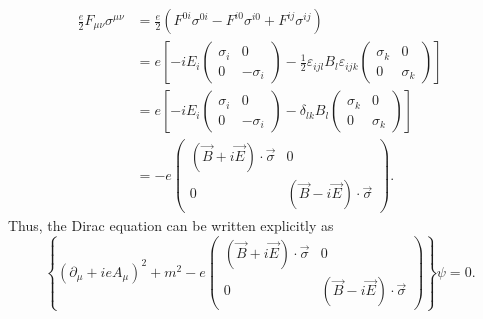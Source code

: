 \documentclass[11pt]{article}
\theoremstyle{definition}
\begin{document}
\begin{equation}
\begin{aligned}
    \frac{e}{2}F_{\mu\nu}\sigma^{\mu\nu} &= \frac{e}{2}(F^{0i}\sigma^{0i} - F^{i0}\sigma^{i0} + F^{ij}\sigma^{ij})\\
    &= e\left[-iE_i
    \begin{pmatrix}
        \sigma_i & 0\\
        0&-\sigma_i
    \end{pmatrix}
    - \frac{1}{2}\varepsilon_{ijl}B_l\varepsilon_{ijk}
    \begin{pmatrix}
        \sigma_k & 0\\
        0& \sigma_k
    \end{pmatrix}
    \right]\\
    &= e\left[-iE_i
    \begin{pmatrix}
        \sigma_i & 0\\
        0&-\sigma_i
    \end{pmatrix}
    - \delta_{lk}B_l
    \begin{pmatrix}
        \sigma_k & 0\\
        0& \sigma_k
    \end{pmatrix}
    \right]\\
    &= -e
    \begin{pmatrix}
        (\vec{B}+i\vec{E})\cdot\vec{\sigma}& 0\\
        0& (\vec{B}-i\vec{E})\cdot\vec{\sigma}
    \end{pmatrix}.
\end{aligned}
\end{equation}
Thus, the Dirac equation can be written explicitly as 
\begin{equation}
    \left\{(\partial_\mu+ieA_\mu)^2 + m^2 -e 
    \begin{pmatrix}
        (\vec{B}+i\vec{E})\cdot\vec{\sigma}& 0\\
        0& (\vec{B}-i\vec{E})\cdot\vec{\sigma}
    \end{pmatrix}
    \right\}\psi = 0.
\end{equation}
\end{document}
